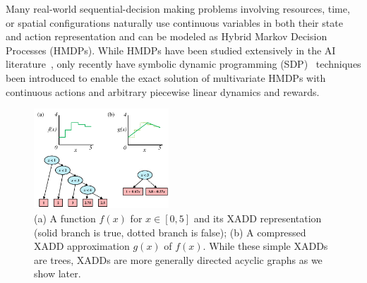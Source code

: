 \label{sec:intro}

Many real-world sequential-decision making problems involving
resources, time, or spatial configurations naturally use continuous
variables in both their state and action representation and can be
modeled as Hybrid Markov Decision Processes (HMDPs).  While HMDPs have
been studied extensively in the AI
literature~\cite{boyan01,feng04,li05,kveton06,phase07,hao09}, only
recently have symbolic dynamic programming
(SDP)~\cite{sanner_uai11,zamani12} techniques been introduced to
enable the exact solution of multivariate HMDPs with continuous
actions and arbitrary piecewise linear dynamics and rewards.



\begin{figure}[!ht]
\vspace{-2mm}
\centering
\hspace{-5mm}\includegraphics[width=0.45\textwidth]{Figures/xadds/intro_diagram.pdf}
\caption{\footnotesize
(a) A function $f(x)$ for $x \in [0,5]$ and its XADD representation
(solid branch is true, dotted branch is false); (b) A compressed XADD
approximation $g(x)$ of $f(x)$.  While these simple XADDs are trees, XADDs 
are more generally directed acyclic graphs as we show 
later.}  \label{fig:stepfunfig}
\vspace{-3mm}
\end{figure}

